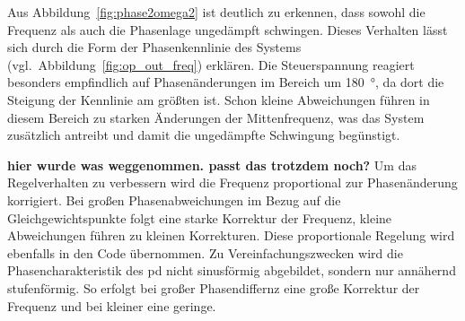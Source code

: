 \documentclass[../main.tex]{subfiles}
\begin{document}
Aus Abbildung~\ref{fig:phase2omega2} ist deutlich zu erkennen, dass sowohl die Frequenz als auch die Phasenlage ungedämpft schwingen. Dieses Verhalten lässt sich durch die Form der Phasenkennlinie des Systems (vgl.~Abbildung~\ref{fig:op_out_freq}) erklären. Die Steuerspannung reagiert besonders empfindlich auf Phasenänderungen im Bereich um \SI{180}{\degree}, da dort die Steigung der Kennlinie am größten ist. Schon kleine Abweichungen führen in diesem Bereich zu starken Änderungen der Mittenfrequenz, was das System zusätzlich antreibt und damit die ungedämpfte Schwingung begünstigt. \par
\medskip
\textbf{hier wurde was weggenommen. passt das trotzdem noch?}
\medskip
Um das Regelverhalten zu verbessern wird die Frequenz proportional zur Phasenänderung korrigiert. Bei großen Phasenabweichungen im Bezug auf die Gleichgewichtspunkte folgt eine starke Korrektur der Frequenz, kleine Abweichungen führen zu kleinen Korrekturen. Diese proportionale Regelung wird ebenfalls in den Code übernommen. Zu Vereinfachungszwecken wird die Phasencharakteristik des \gls{pd} nicht sinusförmig abgebildet, sondern nur annähernd stufenförmig. So erfolgt bei großer Phasendiffernz eine große Korrektur der Frequenz und bei kleiner eine geringe.\par
\end{document}
